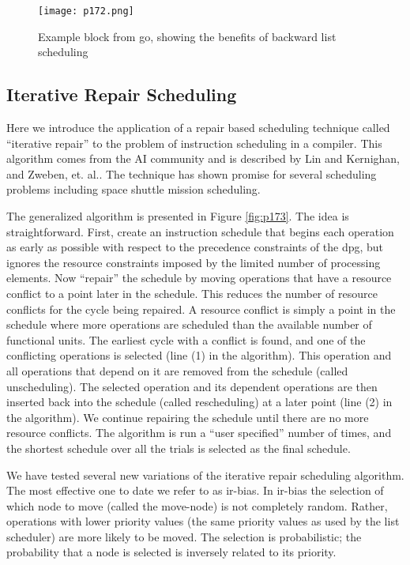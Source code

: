 \begin{figure}[H]
	\centering
	\texttt{[image: p172.png]}
	\caption{Example block from go, showing the benefits of backward list scheduling}
	\label{fig:p172}
\end{figure}


\subsection{Iterative Repair Scheduling}


Here we introduce the application of a repair based scheduling technique called “iterative repair” to the
problem of instruction scheduling in a compiler. This algorithm comes from the AI community and is described by Lin and
Kernighan\cite{lin1973effective}, and Zweben, et. al.\cite{zweben1992scheduling,zweben1992learning}. The technique has shown promise for several
scheduling problems including space shuttle mission scheduling.

The generalized algorithm is presented in Figure \ref{fig:p173}. The idea is straightforward. First, create an instruction
schedule that begins each operation as early as possible with respect to the precedence constraints of the dpg,
but ignores the resource constraints imposed by the limited number of processing elements. Now “repair” the
schedule by moving operations that have a resource conflict to a point later in the schedule. This reduces the
number of resource conflicts for the cycle being repaired. A resource conflict is simply a point in the schedule
where more operations are scheduled than the available number of functional units. The earliest cycle with a
conflict is found, and one of the conflicting operations is selected (line (1) in the algorithm). This operation
and all operations that depend on it are removed from the schedule (called unscheduling). The selected
operation and its dependent operations are then inserted back into the schedule (called rescheduling) at a
later point (line (2) in the algorithm). We continue repairing the schedule until there are no more resource
conflicts. The algorithm is run a “user specified” number of times, and the shortest schedule over all the
trials is selected as the final schedule.

We have tested several new variations of the iterative repair scheduling algorithm. The most effective
one to date we refer to as ir-bias. In ir-bias the selection of which node to move (called the move-node) is
not completely random. Rather, operations with lower priority values (the same priority values as used by
the list scheduler) are more likely to be moved. The selection is probabilistic; the probability that a node is
selected is inversely related to its priority.


